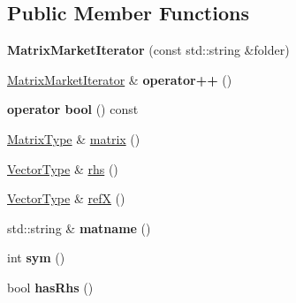 \subsection*{Public Member Functions}
\begin{DoxyCompactItemize}
\item 
\mbox{\label{class_eigen_1_1_matrix_market_iterator_afeab9fb15c3bdcbf4992f49388774478}} 
{\bfseries Matrix\+Market\+Iterator} (const std\+::string \&folder)
\item 
\mbox{\label{class_eigen_1_1_matrix_market_iterator_a26a6bd6f595f4f4aeccd7c5908e19719}} 
\hyperlink{class_eigen_1_1_matrix_market_iterator}{Matrix\+Market\+Iterator} \& {\bfseries operator++} ()
\item 
\mbox{\label{class_eigen_1_1_matrix_market_iterator_a4fe537c57505b15338f68b60d6a6df16}} 
{\bfseries operator bool} () const
\item 
\hyperlink{group___sparse_core___module}{Matrix\+Type} \& \hyperlink{class_eigen_1_1_matrix_market_iterator_ac938961d685306ef5b48d9943f7dcabd}{matrix} ()
\item 
\hyperlink{group___core___module}{Vector\+Type} \& \hyperlink{class_eigen_1_1_matrix_market_iterator_ac141e537f3bc3a3c078a2780a6a956b6}{rhs} ()
\item 
\hyperlink{group___core___module}{Vector\+Type} \& \hyperlink{class_eigen_1_1_matrix_market_iterator_a80f334d9fbbed0d24ba0c32d2bea16bc}{refX} ()
\item 
\mbox{\label{class_eigen_1_1_matrix_market_iterator_a93fa4e525f91d77e178fd3e034b45d29}} 
std\+::string \& {\bfseries matname} ()
\item 
\mbox{\label{class_eigen_1_1_matrix_market_iterator_ace72fd4804dfc9c7fc9018f2712be9fe}} 
int {\bfseries sym} ()
\item 
\mbox{\label{class_eigen_1_1_matrix_market_iterator_a244896bf045ee138e1bfe025907c9b3c}} 
bool {\bfseries has\+Rhs} ()
\item 
\mbox{\label{class_eigen_1_1_matrix_market_iterator_a79fac8d6fd3246f4050d2d93ffd8b961}} 

\end{DoxyCompactItemize}
